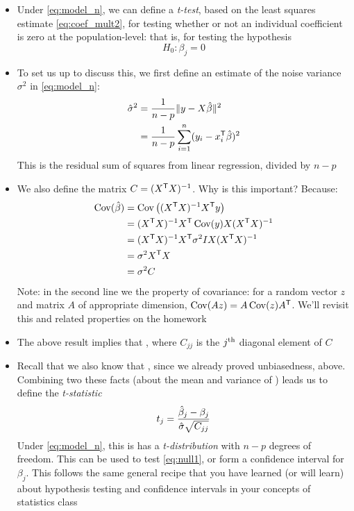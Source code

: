 \documentclass{article}
\begin{document}
\begin{itemize}
\item Under \eqref{eq:model_n}, we can define a \emph{t-test}, based on the
  least squares estimate \eqref{eq:coef_mult2}, for testing whether or not an 
  individual coefficient is zero at the population-level: that is, for testing
  the hypothesis 
  \begin{equation}
  \label{eq:null1}
  H_0 : \beta_j = 0
  \end{equation}

\item To set us up to discuss this, we first define an estimate of the noise
  variance $\sigma^2$ in \eqref{eq:model_n}:
  \begin{align*}
  \hat\sigma^2 &= \frac{1}{n-p} \|y - X\hat{\beta}\|^2 \\
  &= \frac{1}{n-p} \sum_{i=1}^n (y_ i - x_i^{\mathsf{T}} \hat{\beta})^2 
  \end{align*}
  This is the residual sum of squares from linear regression, divided by $n-p$ 

\item We also define the matrix $C = (X^{\mathsf{T}} X)^{-1}$. Why is this important?
  Because: 
  \begin{align*}
  \operatorname{Cov}(\hat{\beta}) &= \operatorname{Cov}\big( (X^{\mathsf{T}} X)^{-1} X^{\mathsf{T}} y \big) \\
  &= (X^{\mathsf{T}} X)^{-1} X^{\mathsf{T}} \operatorname{Cov}(y) X (X^{\mathsf{T}} X)^{-1} \\
  &=  (X^{\mathsf{T}} X)^{-1} X^{\mathsf{T}} \sigma^2 I X (X^{\mathsf{T}} X)^{-1} \\
  &= \sigma^2 X^{\mathsf{T}} X \\
  &= \sigma^2 C
  \end{align*}
  Note: in the second line we the property of covariance: for a random vector
  $z$ and matrix $A$ of appropriate dimension, $\operatorname{Cov}(Az) = A \operatorname{Cov}(z)
  A^{\mathsf{T}}$. We'll revisit this and related properties on the homework

\item The above result implies that ,
  where $C_{jj}$ is the $j^{\textnormal{th}}$ diagonal element of $C$

\item Recall that we also know that , since we
  already proved unbiasedness, above. Combining two these facts (about the mean 
  and variance of ) leads us to define the \emph{t-statistic}  
  \begin{equation}
  \label{eq:t_stat}
  t_j = \frac{\hat{\beta}_j - \beta_j}{\hat\sigma \sqrt{C_{jj}}} 
  \end{equation}
  Under \eqref{eq:model_n}, this is has a \emph{t-distribution} with $n-p$
  degrees of freedom. This can be used to test \eqref{eq:null1}, or form a
  confidence interval for $\beta_j$. This follows the same general recipe that
  you have learned (or will learn) about hypothesis testing and confidence
  intervals in your concepts of statistics class


\end{itemize}
\end{document}
